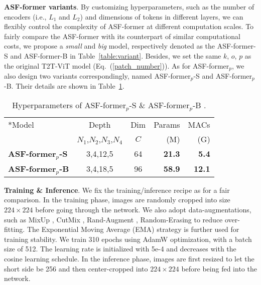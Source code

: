 \documentclass[lettersize,journal]{IEEEtran}
\begin{document}
\textbf{ASF-former variants}. By customizing hyperparameters, such as the number of encoders (i.e., $L_1$ and $L_2$) and dimensions of tokens in different layers, we can flexibly control the complexity of ASF-former at different computation scales. To fairly compare the ASF-former with its counterpart of similar computational costs, we propose a \textit{small} and \textit{big} model, respectively denoted as the ASF-former-S and ASF-former-B in Table~\ref{table:variant}. Besides, we set the same $k$, $o$, $p$ as the original T2T-ViT model (Eq.~(\ref{patch_number})). As for ASF-former$_p$, we also design two variants correspondingly, named ASF-former$_p$-S and ASF-former$_p$-B. Their details are shown in Table~\ref{table:variant_p}.

\setlength{\tabcolsep}{8pt}
\begin{table}
\begin{center}
\caption{Hyperparameters of ASF-former$_p$-S \& ASF-former$_p$-B .}
\label{table:variant_p}
\begin{tabular}{l|cc|rr}
\hline\noalign{\smallskip}
\multirow{2}*{Model} &Depth &Dim &Params &MACs\\
 &$N_1$,$N_2$,$N_3$,$N_4$ &$C$ &(M) &(G)\\
\noalign{\smallskip}
\hline
\noalign{\smallskip}
\textbf{ASF-former$_p$-S} &3,4,12,5 &64 &\textbf{21.3} &\textbf{5.4}\\
\textbf{ASF-former$_p$-B} &3,4,18,5 &96 &\textbf{58.9} &\textbf{12.1}\\
\hline
\end{tabular}
\end{center}
\end{table}
\setlength{\tabcolsep}{1.4pt}

\textbf{Training \& Inference}. We fix the training/inference recipe as \cite{yuan2021tokens} for a fair comparison. In the training phase, images are randomly cropped into size $224\times224$ before going through the network. We also adopt data-augmentations, such as MixUp \cite{zhang2018mixup}, CutMix \cite{yun2019cutmix}, Rand-Augment \cite{Cubuk2020RandaugmentPA}, Random-Erasing \cite{zhong2020random} to reduce over-fitting. The Exponential Moving Average (EMA) strategy is further used for training stability. We train 310 epochs using AdamW optimization, with a batch size of 512. The learning rate is initialized with 5e-4 and decreases with the cosine learning schedule. 
In the inference phase, images are first resized to let the short side be 256 and then center-cropped into $224 \times 224$ before being fed into the network.
\end{document}

